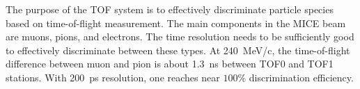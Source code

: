 


The purpose of the TOF system is to effectively discriminate particle species
based on time-of-flight measurement. The main components in the
MICE beam are muons, pions, and electrons. The time resolution needs
to be sufficiently good to effectively discriminate between these
types. At 240~MeV/c, the time-of-flight difference between muon and
pion is about 1.3~ns between TOF0 and TOF1 stations. With 200~ps
resolution, one reaches near $100\%$ discrimination efficiency.



